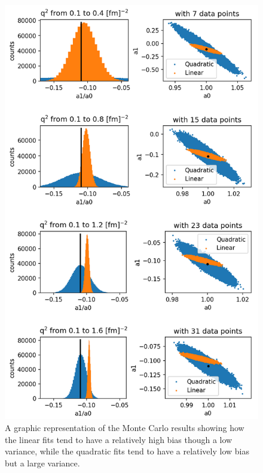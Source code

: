 \documentclass[10pt,aps,prc,twocolumn]{revtex4-1}
\begin{document}
\begin{figure}[htbp]
\includegraphics[width=\columnwidth]{Figure/zresult.png}
\caption{A graphic representation of the Monte Carlo results showing how the linear fits tend to have a relatively
high bias though a low variance, while the quadratic fits tend to have a relatively low bias but a large variance.}
\end{figure}
\end{document}
